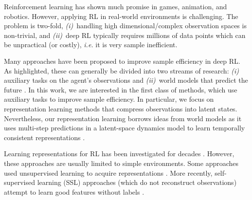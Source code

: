 \documentclass{article}
\makeatletter
\theoremstyle{plain}
\theoremstyle{definition}
\theoremstyle{remark}
\newcommand{\eg}{\textit{e.g.\@}\xspace}
\newcommand{\ie}{\textit{i.e.\@}\xspace}
\makeatother
\begin{document}
Reinforcement learning  \citep[RL, \eg][]{sutton2018reinforcement} has shown much promise in games, animation, and robotics.
However, applying RL in real-world environments is challenging. The problem is two-fold,
{\em (i)}~handling high dimensional/complex observation spaces is non-trivial, and {\em (ii)}~deep RL typically requires millions of data points which can be unpractical (or costly), \ie it is very sample inefficient.

Many approaches have been proposed to improve sample efficiency in deep RL.
As \citet{laskinCURLContrastiveUnsupervised2020} highlighted, these can generally be divided into two streams of research:
{\em (i)} auxiliary tasks on the agent's observations and {\em (ii)}~world models that predict the future
\citep{haRecurrentWorldModels2018,hafnerLearning2019,hansenTemporalDifferenceLearning2022}.
In this work, we are interested in the first class of methods, which use auxiliary tasks to improve sample efficiency.
In particular, we focus on representation learning methods that compress observations into latent states.
Nevertheless, our representation learning borrows ideas from world models as it uses multi-step predictions in a
latent-space dynamics model to learn temporally consistent representations \citep{zhaoSimplifiedTemporalConsistency2023}.

Learning representations for RL has been investigated for decades
\citep{abelOptimalBehaviorApproximate2016,mannorDynamicAbstractionReinforcement2004,liUnifiedTheoryState2006,andreStateAbstractionProgrammable2002,deardenAbstractionApproximateDecisiontheoretic1997,singhReinforcementLearningSoft1994,higginsDefinitionDisentangledRepresentations2018,vanhoofStableReinforcementLearning2016,watterEmbedControlLocally2015,ghoshRepresentationsStableOffPolicy2020}.
However, these approaches are usually limited to simple environments.
Some approaches used unsupervised learning \citep[\eg\ VAE,][with reconstruction loss]{kingmaAutoEncoding2014} to acquire representations
\citep{finnDeepSpatialAutoencoders2016,higginsDARLAImprovingZeroShot2017,langeAutonomousReinforcementLearning2012,watterEmbedControlLocally2015}.
More recently, self-supervised learning (SSL) approaches (which do not reconstruct observations)
attempt to learn good features without labels \cite{anandUnsupervisedStateRepresentation2019}.
\end{document}

